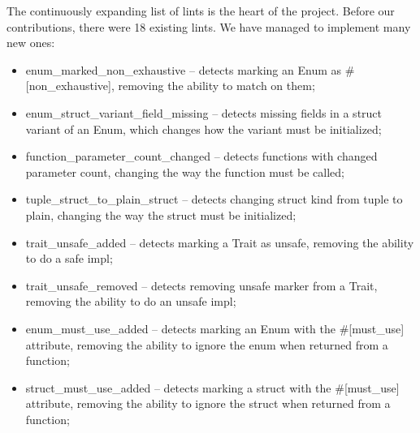 \documentclass[licencjacka,en]{pracamgr}
\begin{document}
The continuously expanding list of lints is the heart of the project.
Before our contributions, there were 18 existing lints.
We have managed to implement many new ones:
\begin{itemize}
    \item {\ttfamily enum\_marked\_non\_exhaustive}
        -- detects marking an {\ttfamily Enum} as {\ttfamily \#[non\_exhaustive]}, removing the ability to match on them;
    \item {\ttfamily enum\_struct\_variant\_field\_missing}
        -- detects missing fields in a struct variant of an {\ttfamily Enum},
        which changes how the variant must be initialized;
    \item {\ttfamily function\_parameter\_count\_changed}
        -- detects functions with changed parameter count,
        changing the way the function must be called;
    \item {\ttfamily tuple\_struct\_to\_plain\_struct}
        -- detects changing struct kind from tuple to plain,
        changing the way the struct must be initialized;
    \item {\ttfamily trait\_unsafe\_added}
        -- detects marking a {\ttfamily Trait} as {\ttfamily unsafe},
        removing the ability to do a safe {\ttfamily impl};
    \item {\ttfamily trait\_unsafe\_removed}
        -- detects removing {\ttfamily unsafe} marker from a {\ttfamily Trait},
        removing the ability to do an unsafe {\ttfamily impl};
    \item {\ttfamily enum\_must\_use\_added}
        -- detects marking an {\ttfamily Enum} with the {\ttfamily \#[must\_use]} attribute,
        removing the ability to ignore the enum when returned from a function;
    \item {\ttfamily struct\_must\_use\_added}
        -- detects marking a struct with the {\ttfamily \#[must\_use]} attribute,
        removing the ability to ignore the struct when returned from a function;

\end{itemize}
\end{document}
